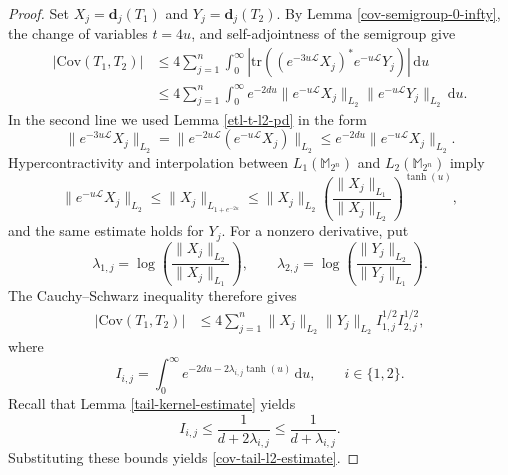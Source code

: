\documentclass{amsbook}
\theoremstyle{definition}
\theoremstyle{remark}
\numberwithin{section}{chapter}
\numberwithin{equation}{chapter}
\newcommand{\M}{\mathbb{M}}
\newcommand{\1}{\mathbf{1}}
\newcommand{\tr}{\mathrm{tr}}
\newcommand{\dc}{\mathbf{d}}
\begin{document}
\begin{proof}
Set $X_{j}=\dc_{j}(T_{1})$ and $Y_{j}=\dc_{j}(T_{2})$. By Lemma
\ref{cov-semigroup-0-infty}, the change of variables $t=4u$, and
self-adjointness of the semigroup give
\begin{align*}
\big|\mathrm{Cov}(T_{1},T_{2})\big|
&\leq4\sum_{j=1}^{n}\int_{0}^{\infty}
 \left|\tr\!\left((e^{-3u\mathcal{L}}X_{j})^{*}
                         e^{-u\mathcal{L}}Y_{j}\right)\right|\,\mathrm{d}u\\
&\leq4\sum_{j=1}^{n}\int_{0}^{\infty}e^{-2du}
 \|e^{-u\mathcal{L}}X_{j}\|_{L_{2}}
 \|e^{-u\mathcal{L}}Y_{j}\|_{L_{2}}\,\mathrm{d}u.
\end{align*}
In the second line we used Lemma \ref{etl-t-l2-pd} in the form
\[
\|e^{-3u\mathcal{L}}X_{j}\|_{L_{2}}
 =\|e^{-2u\mathcal{L}}(e^{-u\mathcal{L}}X_{j})\|_{L_{2}}
 \leq e^{-2du}\|e^{-u\mathcal{L}}X_{j}\|_{L_{2}}.
\]
Hypercontractivity and interpolation between $L_{1}(\M_{2^{n}})$ and $L_{2}(\M_{2^{n}})$ imply
\[
\|e^{-u\mathcal{L}}X_{j}\|_{L_{2}}
 \leq\|X_{j}\|_{L_{1+e^{-2u}}}
 \leq\|X_{j}\|_{L_{2}}
       \left(\frac{\|X_{j}\|_{L_{1}}}{\|X_{j}\|_{L_{2}}}\right)^{\tanh(u)},
\]
and the same estimate holds for $Y_{j}$.  For a nonzero derivative, put
\[
\lambda_{1,j}=\log\left(\frac{\|X_{j}\|_{L_{2}}}{\|X_{j}\|_{L_{1}}}\right),
\qquad
\lambda_{2,j}=\log\left(\frac{\|Y_{j}\|_{L_{2}}}{\|Y_{j}\|_{L_{1}}}\right).
\]
The Cauchy--Schwarz inequality therefore gives
\begin{align*}
\big|\mathrm{Cov}(T_{1},T_{2})\big|
&\leq4\sum_{j=1}^{n}\|X_{j}\|_{L_{2}}\|Y_{j}\|_{L_{2}}
 I_{1,j}^{1/2}I_{2,j}^{1/2},
\end{align*}
where
\[
I_{i,j}=\int_{0}^{\infty}
 e^{-2du-2\lambda_{i,j}\tanh(u)}\,\mathrm{d}u,
\qquad i\in\{1,2\}.
\]
Recall that Lemma \ref{tail-kernel-estimate} yields
\[
I_{i,j}\leq\frac{1}{d+2\lambda_{i,j}}
 \leq\frac{1}{d+\lambda_{i,j}}.
\]
Substituting these bounds yields \eqref{cov-tail-l2-estimate}.

\end{proof}
\end{document}
